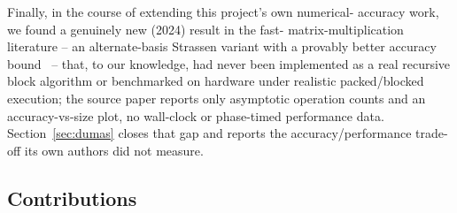 \documentclass[acmsmall]{acmart}
\begin{document}
Finally, in the course of extending this project's own numerical-
accuracy work, we found a genuinely new (2024) result in the fast-
matrix-multiplication literature -- an alternate-basis Strassen variant
with a provably better accuracy bound~\cite{dumas2024strassen} -- that,
to our knowledge, had never been implemented as a real recursive block
algorithm or benchmarked on hardware under realistic packed/blocked
execution; the source paper reports only asymptotic operation counts
and an accuracy-vs-size plot, no wall-clock or phase-timed performance
data. Section~\ref{sec:dumas} closes that gap and reports the
accuracy/performance trade-off its own authors did not measure.

\subsection{Contributions}
\end{document}
